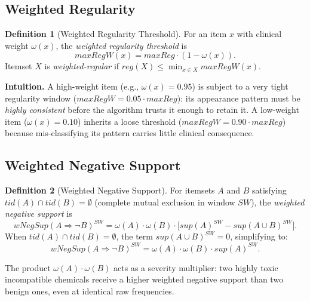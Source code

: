 \documentclass[10pt,twocolumn]{article}
\theoremstyle{plain}
\theoremstyle{definition}
\newtheorem{definition}{Definition}[section]
\theoremstyle{remark}
\newcommand{\wNegSup}{\mathit{wNegSup}}
\newcommand{\maxRegW}{\mathit{maxRegW}}
\newcommand{\SW}{\mathit{SW}}
\begin{document}
\subsection{Weighted Regularity}

\begin{definition}[Weighted Regularity Threshold]
\label{def:weighted_regularity}
For an item $x$ with clinical weight $\omega(x)$, the
\emph{weighted regularity threshold} is
\[
  \maxRegW(x) = \mathit{maxReg} \cdot (1 - \omega(x)).
\]
Itemset $X$ is \emph{weighted-regular} if
$\mathit{reg}(X) \leq \min_{x \in X}\maxRegW(x)$.
\end{definition}

\begin{tcolorbox}[notebox]
\textbf{Intuition.}
A high-weight item (e.g., $\omega(x) = 0.95$) is subject to a very
tight regularity window ($\maxRegW = 0.05 \cdot \mathit{maxReg}$):
its appearance pattern must be \emph{highly consistent} before the
algorithm trusts it enough to retain it.
A low-weight item ($\omega(x) = 0.10$) inherits a loose threshold
($\maxRegW = 0.90 \cdot \mathit{maxReg}$) because mis-classifying its
pattern carries little clinical consequence.
\end{tcolorbox}

\subsection{Weighted Negative Support}

\begin{definition}[Weighted Negative Support]
\label{def:wnegsup}
For itemsets $A$ and $B$ satisfying
$\mathit{tid}(A) \cap \mathit{tid}(B) = \emptyset$ (complete mutual
exclusion in window $\SW$), the \emph{weighted negative support} is
\begin{equation}
  \wNegSup(A \Rightarrow \lnot B)^{\SW}
    = \omega(A)\cdot\omega(B)
      \cdot\bigl[\mathit{sup}(A)^{\SW} - \mathit{sup}(A \cup B)^{\SW}\bigr].
  \label{eq:wnegsup}
\end{equation}
When $\mathit{tid}(A) \cap \mathit{tid}(B) = \emptyset$, the term
$\mathit{sup}(A \cup B)^{\SW} = 0$, simplifying to:
\[
  \wNegSup(A \Rightarrow \lnot B)^{\SW}
    = \omega(A)\cdot\omega(B)\cdot\mathit{sup}(A)^{\SW}.
\]
\end{definition}

The product $\omega(A)\cdot\omega(B)$ acts as a severity multiplier:
two highly toxic incompatible chemicals receive a higher weighted
negative support than two benign ones, even at identical raw
frequencies.
\end{document}
